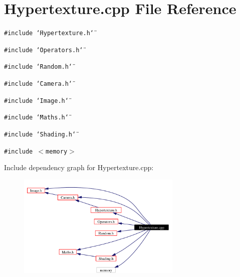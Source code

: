 \section{Hypertexture.cpp File Reference}
\label{Hypertexture_8cpp}
{\tt \#include \char`\"{}Hypertexture.h\char`\"{}}\par
{\tt \#include \char`\"{}Operators.h\char`\"{}}\par
{\tt \#include \char`\"{}Random.h\char`\"{}}\par
{\tt \#include \char`\"{}Camera.h\char`\"{}}\par
{\tt \#include \char`\"{}Image.h\char`\"{}}\par
{\tt \#include \char`\"{}Maths.h\char`\"{}}\par
{\tt \#include \char`\"{}Shading.h\char`\"{}}\par
{\tt \#include $<$memory$>$}\par


Include dependency graph for Hypertexture.cpp:\begin{figure}[H]
\begin{center}
\leavevmode
\includegraphics[width=222pt]{Hypertexture_8cpp__incl}
\end{center}
\end{figure}
